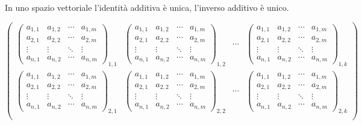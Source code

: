 \documentclass[a4paper]{article}
\begin{document}
In uno spazio vettoriale l'identità additiva è unica, l'inverso additivo è unico.

\[
    \begin{pmatrix}
        {\begin{pmatrix} a_{1,1} & a_{1,2} & \cdots & a_{1,m} \\ a_{2,1} & a_{2,2} & \cdots & a_{2,m} \\ \vdots  & \vdots  & \ddots & \vdots  \\ a_{n,1} & a_{n,2} & \cdots & a_{n,m} \end{pmatrix}}_{1,1} & {\begin{pmatrix} a_{1,1} & a_{1,2} & \cdots & a_{1,m} \\ a_{2,1} & a_{2,2} & \cdots & a_{2,m} \\ \vdots  & \vdots  & \ddots & \vdots  \\ a_{n,1} & a_{n,2} & \cdots & a_{n,m} \end{pmatrix}}_{1,2} & \cdots & {\begin{pmatrix} a_{1,1} & a_{1,2} & \cdots & a_{1,m} \\ a_{2,1} & a_{2,2} & \cdots & a_{2,m} \\ \vdots  & \vdots  & \ddots & \vdots  \\ a_{n,1} & a_{n,2} & \cdots & a_{n,m} \end{pmatrix}}_{1,k} \\
        {\begin{pmatrix} a_{1,1} & a_{1,2} & \cdots & a_{1,m} \\ a_{2,1} & a_{2,2} & \cdots & a_{2,m} \\ \vdots  & \vdots  & \ddots & \vdots  \\ a_{n,1} & a_{n,2} & \cdots & a_{n,m} \end{pmatrix}}_{2,1} & {\begin{pmatrix} a_{1,1} & a_{1,2} & \cdots & a_{1,m} \\ a_{2,1} & a_{2,2} & \cdots & a_{2,m} \\ \vdots  & \vdots  & \ddots & \vdots  \\ a_{n,1} & a_{n,2} & \cdots & a_{n,m} \end{pmatrix}}_{2,2} & \cdots & {\begin{pmatrix} a_{1,1} & a_{1,2} & \cdots & a_{1,m} \\ a_{2,1} & a_{2,2} & \cdots & a_{2,m} \\ \vdots  & \vdots  & \ddots & \vdots  \\ a_{n,1} & a_{n,2} & \cdots & a_{n,m} \end{pmatrix}}_{2,k} \\

\end{pmatrix}\]
\end{document}
